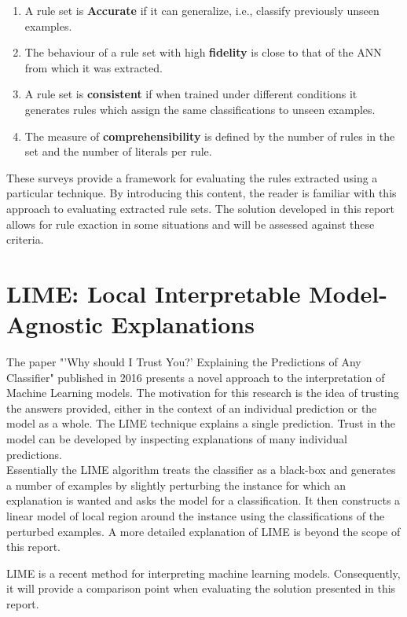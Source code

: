 \begin{enumerate}
\item A rule set is \textbf{Accurate} if it can generalize, i.e., classify previously unseen examples.
\item The behaviour of a rule set with high \textbf{fidelity} is close to that of the ANN from which it was extracted.
\item A rule set is \textbf{consistent} if when trained under different conditions it generates rules which assign the same classifications to unseen examples.
\item The measure of \textbf{comprehensibility} is defined by the number of rules in the set and the number of literals per rule.
\end{enumerate}

These surveys provide a framework for evaluating the rules extracted using a particular technique. By introducing this content, the reader is familiar with this approach to evaluating extracted rule sets. The solution developed in this report allows for rule exaction in some situations and will be assessed against these criteria. 

\section{LIME: Local Interpretable Model-Agnostic Explanations}
The paper "'Why should I Trust You?' Explaining the Predictions of Any Classifier" \cite{ribeiro2016should} published in 2016 presents a novel approach to the interpretation of Machine Learning models. The motivation for this research is the idea of trusting the answers provided, either in the context of an individual prediction or the model as a whole. The LIME technique explains  a single prediction. Trust in the model can be developed by inspecting explanations of many individual predictions.\\

Essentially the LIME algorithm treats the classifier as a black-box and generates a number of examples by slightly perturbing the instance for which an explanation is wanted and asks the model for a classification. It then constructs a linear model of local region around the instance using the classifications of the perturbed examples. A more detailed explanation of LIME is beyond the scope of this report.

LIME is a recent method for interpreting machine learning models. Consequently, it will provide a comparison point when evaluating the solution presented in this report.

